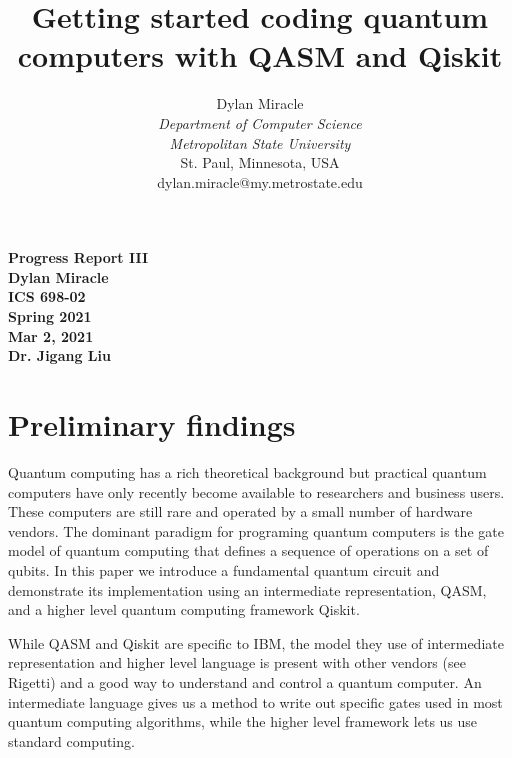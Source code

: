 \documentclass{article}
\begin{document}
\begin{titlepage}
    \begin{center}
        \vspace{4cm}
        \large
        \textbf{
            Progress Report III \\
            Dylan Miracle \\
            ICS 698-02 \\
            Spring 2021 \\
            Mar 2, 2021 \\
            Dr. Jigang Liu
        }
    \end{center}
\end{titlepage}
\title{Getting started coding quantum computers with QASM and Qiskit}

\author{Dylan Miracle\\
\textit{Department of Computer Science} \\
\textit{Metropolitan State University}\\
St. Paul, Minnesota, USA \\
dylan.miracle@my.metrostate.edu
}

\maketitle

\tableofcontents

\section{Preliminary findings}
Quantum computing has a rich theoretical background but practical quantum computers have only recently become available to researchers and business users. These computers are still rare and operated by a small number of hardware vendors. The dominant paradigm for programing quantum computers is the gate model of quantum computing that defines a sequence of operations on a set of qubits. In this paper we introduce a fundamental quantum circuit and demonstrate its implementation using an intermediate representation, QASM, and a higher level quantum computing framework Qiskit. 

While QASM and Qiskit are specific to IBM, the model they use of intermediate representation and higher level language is present with other vendors (see Rigetti) and a good way to understand and control a quantum computer. An intermediate language gives us a method to write out specific gates used in most quantum computing algorithms, while the higher level framework lets us use standard computing. 
\end{document}
